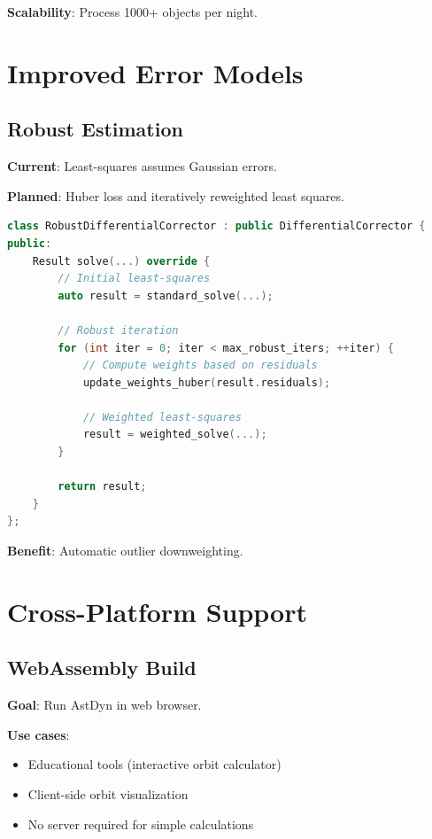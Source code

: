 \textbf{Scalability}: Process 1000+ objects per night.

\section{Improved Error Models}

\subsection{Robust Estimation}

\textbf{Current}: Least-squares assumes Gaussian errors.

\textbf{Planned}: Huber loss and iteratively reweighted least squares.

\begin{lstlisting}[language=C++]
class RobustDifferentialCorrector : public DifferentialCorrector {
public:
    Result solve(...) override {
        // Initial least-squares
        auto result = standard_solve(...);
        
        // Robust iteration
        for (int iter = 0; iter < max_robust_iters; ++iter) {
            // Compute weights based on residuals
            update_weights_huber(result.residuals);
            
            // Weighted least-squares
            result = weighted_solve(...);
        }
        
        return result;
    }
};
\end{lstlisting}

\textbf{Benefit}: Automatic outlier downweighting.

\section{Cross-Platform Support}

\subsection{WebAssembly Build}

\textbf{Goal}: Run AstDyn in web browser.

\textbf{Use cases}:
\begin{itemize}
    \item Educational tools (interactive orbit calculator)
    \item Client-side orbit visualization
    \item No server required for simple calculations
\end{itemize}

